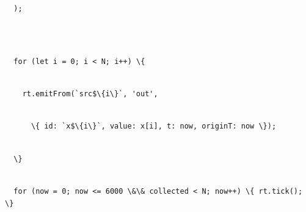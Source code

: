 \documentclass[
]{article}
\newcommand{\passthrough}[1]{#1}
\begin{document}
\passthrough{\lstinline!  !}\passthrough{\lstinline!);!}\strut \\
\strut \\
\passthrough{\lstinline!  !}\passthrough{\lstinline!for!}\passthrough{\lstinline! !}\passthrough{\lstinline!(let!}\passthrough{\lstinline! !}\passthrough{\lstinline!i!}\passthrough{\lstinline! !}\passthrough{\lstinline!=!}\passthrough{\lstinline! !}\passthrough{\lstinline!0;!}\passthrough{\lstinline! !}\passthrough{\lstinline!i!}\passthrough{\lstinline! !}\passthrough{\lstinline!<!}\passthrough{\lstinline! !}\passthrough{\lstinline!N;!}\passthrough{\lstinline! !}\passthrough{\lstinline!i++)!}\passthrough{\lstinline! !}\passthrough{\lstinline!\{!}\strut \\
\passthrough{\lstinline!    !}\passthrough{\lstinline!rt.emitFrom!}\passthrough{\lstinline!(`!}\passthrough{\lstinline!src!}\passthrough{\lstinline!$\{i\}`,!}\passthrough{\lstinline! !}\passthrough{\lstinline!'out',!}\strut \\
\passthrough{\lstinline!      !}\passthrough{\lstinline!\{!}\passthrough{\lstinline! !}\passthrough{\lstinline!id:!}\passthrough{\lstinline! !}\passthrough{\lstinline!`x$\{i\}`,!}\passthrough{\lstinline! !}\passthrough{\lstinline!value:!}\passthrough{\lstinline! !}\passthrough{\lstinline!x[i],!}\passthrough{\lstinline! !}\passthrough{\lstinline!t:!}\passthrough{\lstinline! !}\passthrough{\lstinline!now,!}\passthrough{\lstinline! !}\passthrough{\lstinline!originT!}\passthrough{\lstinline!:!}\passthrough{\lstinline! !}\passthrough{\lstinline!now!}\passthrough{\lstinline! !}\passthrough{\lstinline!\});!}\strut \\
\passthrough{\lstinline!  !}\passthrough{\lstinline!\}!}\strut \\
\passthrough{\lstinline!  !}\passthrough{\lstinline!for!}\passthrough{\lstinline! !}\passthrough{\lstinline!(now!}\passthrough{\lstinline! !}\passthrough{\lstinline!=!}\passthrough{\lstinline! !}\passthrough{\lstinline!0;!}\passthrough{\lstinline! !}\passthrough{\lstinline!now!}\passthrough{\lstinline! !}\passthrough{\lstinline!<=!}\passthrough{\lstinline! !}\passthrough{\lstinline!6000!}\passthrough{\lstinline! !}\passthrough{\lstinline!\&\&!}\passthrough{\lstinline! !}\passthrough{\lstinline!collected!}\passthrough{\lstinline! !}\passthrough{\lstinline!<!}\passthrough{\lstinline! !}\passthrough{\lstinline!N;!}\passthrough{\lstinline! !}\passthrough{\lstinline!now++)!}\passthrough{\lstinline! !}\passthrough{\lstinline!\{!}\passthrough{\lstinline! !}\passthrough{\lstinline!rt.tick!}\passthrough{\lstinline!();!}\passthrough{\lstinline! !}\passthrough{\lstinline!\}!}\strut \\
\end{document}
